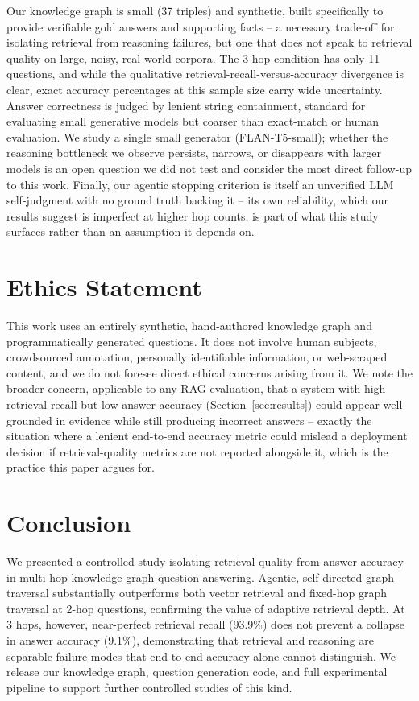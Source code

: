 \documentclass[11pt]{article}
\begin{document}
Our knowledge graph is small (37 triples) and synthetic, built specifically to provide verifiable gold answers and supporting facts -- a necessary trade-off for isolating retrieval from reasoning failures, but one that does not speak to retrieval quality on large, noisy, real-world corpora. The 3-hop condition has only 11 questions, and while the qualitative retrieval-recall-versus-accuracy divergence is clear, exact accuracy percentages at this sample size carry wide uncertainty. Answer correctness is judged by lenient string containment, standard for evaluating small generative models but coarser than exact-match or human evaluation. We study a single small generator (FLAN-T5-small); whether the reasoning bottleneck we observe persists, narrows, or disappears with larger models is an open question we did not test and consider the most direct follow-up to this work. Finally, our agentic stopping criterion is itself an unverified LLM self-judgment with no ground truth backing it -- its own reliability, which our results suggest is imperfect at higher hop counts, is part of what this study surfaces rather than an assumption it depends on.

\section{Ethics Statement}

This work uses an entirely synthetic, hand-authored knowledge graph and programmatically generated questions. It does not involve human subjects, crowdsourced annotation, personally identifiable information, or web-scraped content, and we do not foresee direct ethical concerns arising from it. We note the broader concern, applicable to any RAG evaluation, that a system with high retrieval recall but low answer accuracy (Section~\ref{sec:results}) could appear well-grounded in evidence while still producing incorrect answers -- exactly the situation where a lenient end-to-end accuracy metric could mislead a deployment decision if retrieval-quality metrics are not reported alongside it, which is the practice this paper argues for.

\section{Conclusion}

We presented a controlled study isolating retrieval quality from answer accuracy in multi-hop knowledge graph question answering. Agentic, self-directed graph traversal substantially outperforms both vector retrieval and fixed-hop graph traversal at 2-hop questions, confirming the value of adaptive retrieval depth. At 3 hops, however, near-perfect retrieval recall (93.9\%) does not prevent a collapse in answer accuracy (9.1\%), demonstrating that retrieval and reasoning are separable failure modes that end-to-end accuracy alone cannot distinguish. We release our knowledge graph, question generation code, and full experimental pipeline to support further controlled studies of this kind.
\end{document}
